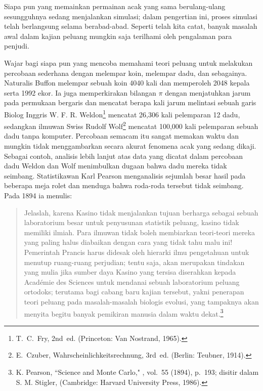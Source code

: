Siapa pun yang memainkan permainan acak yang sama berulang-ulang sesungguhnya sedang menjalankan
simulasi; dalam pengertian ini, proses simulasi telah berlangsung selama
berabad-abad.  Seperti telah kita catat, banyak masalah awal dalam kajian peluang
mungkin saja terilhami oleh pengalaman para penjudi.  
\par
Wajar bagi siapa pun yang mencoba memahami teori peluang untuk melakukan
percobaan sederhana dengan melempar koin, melempar dadu, dan sebagainya.  Naturalis
Buffon melempar sebuah koin 4040 kali dan memperoleh 2048 kepala serta 1992 ekor.  Ia
juga memperkirakan bilangan $\pi$ dengan menjatuhkan jarum pada permukaan bergaris dan
mencatat berapa kali jarum melintasi sebuah garis   Biolog Inggris W. F. R. Weldon\footnote{T.~C.~Fry,
 2nd~ed. (Princeton: Van Nostrand, 1965).}
mencatat 26{,}306 kali pelemparan 12 dadu, sedangkan
ilmuwan Swiss Rudolf Wolf\footnote{E.~Czuber, \emx
{Wahrscheinlichkeitsrechnung,} 3rd~ed. (Berlin: Teubner, 1914).} mencatat
100{,}000 kali pelemparan sebuah dadu tanpa komputer.  Percobaan semacam itu
sangat
memakan waktu dan mungkin tidak menggambarkan secara akurat fenomena acak yang sedang
dikaji.  Sebagai contoh, analisis lebih lanjut atas data yang dicatat dalam
percobaan dadu Weldon dan Wolf menimbulkan dugaan bahwa dadu mereka tidak seimbang.
Statistikawan Karl Pearson menganalisis sejumlah besar hasil pada beberapa
meja rolet dan menduga bahwa roda-roda tersebut tidak seimbang.  Pada 1894 ia menulis:

\begin{quote} 
Jelaslah, karena Kasino tidak menjalankan tujuan berharga sebagai sebuah
laboratorium besar untuk penyusunan statistik peluang, kasino tidak memiliki
 ilmiah.  Para ilmuwan tidak boleh membiarkan teori-teori mereka yang paling
halus diabaikan dengan cara yang tidak tahu malu ini!  Pemerintah Prancis harus
didesak oleh hierarki ilmu pengetahuan untuk menutup ruang-ruang perjudian; tentu
saja, akan merupakan tindakan yang mulia jika sumber daya Kasino yang tersisa diserahkan kepada
Acad\'emie des Sciences untuk mendanai sebuah laboratorium peluang
ortodoks; terutama bagi cabang baru kajian tersebut, yakni penerapan
teori peluang pada masalah-masalah biologis evolusi, yang tampaknya akan
menyita begitu banyak pemikiran manusia dalam waktu dekat.\footnote{K. Pearson,
``Science and Monte Carlo," , vol.~55 (1894),
p.~193;
disitir dalam S. M. Stigler,  (Cambridge: Harvard
University Press, 1986).}
\end{quote}

